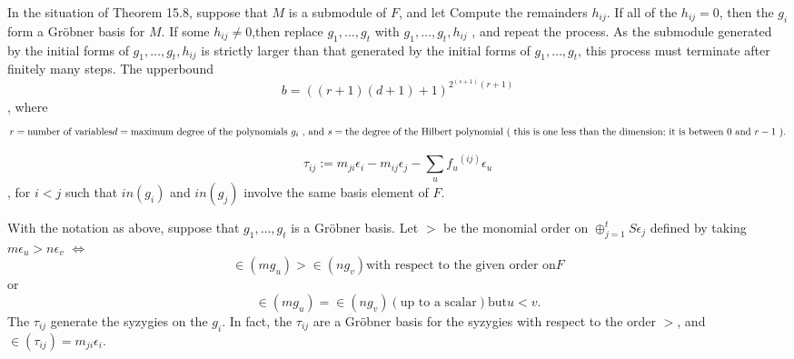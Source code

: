 \documentclass{article}
\begin{document}
{\color{red}

\begin{algo}
In the situation of Theorem 15.8, suppose that \( M \) is a submodule of \( F \), and let
Compute the remainders \( h_{ij} \).
If all of the \( h_{ij}=0 \), then the \( g_i \) form a Gr\"obner basis for \( M \).
If some \( h_{ij} \neq 0\),then replace
\( g_1, \dots,g_t \)
with
\( g_1, \dots,g_t,h_{ij} \)
, and repeat the process.
As the submodule generated by the initial forms of
\(g_1,\dots,g_t,h_{ij} \)
is strictly larger than that generated by the initial forms of
\( g_1, \dots,g_t \),
this process must terminate after finitely many steps.
The upperbound \[
b=\left( \left( r+1 \right)\left( d+1 \right)+1 \right)^{2^{(s+1)}(r+1) }
\],
where
\[
r = \text{number of variables} \\
d = \text{maximum degree of the polynomials \( g_i\) , and } \\
s = \text{the degree of the Hilbert polynomial ( this is one less than the dimension; it is between \( 0 \) and \(r-1\) ).}
\]
\end{algo}

\begin{defn}[\nocite{Eis1}{334}]
\[
\tau_{ij}:=m_{ji}\epsilon_{i} - m_{ij} \epsilon_{j} - \sum_{u} {f_{u}}^{\left( ij \right) } \epsilon_{u} 
\],
for \( i < j \) such that \( in \left( g_{i}  \right) \) and \( in \left( g_{j}  \right) \)
involve the same basis element of \( F \).
\end{defn}
}
{\color{red}
\begin{thm}[Schreyer \cite{Eis1}[15.10]
With the notation as above, suppose that
\( g_1,\dots,g_t\)
is a Gr\"obner basis.
Let \( > \) be the monomial order on
\( \oplus_{j=1}^t S \epsilon_{j} \)
defined by taking
\( m \epsilon_{u} > n \epsilon_{v} \)
\(\iff\)
\[
\in\left(  m g_{u} \right) > \in\left( n g_{v} \right) 
\text{with respect to the given order on} F 
\]
or
\[
\in\left( m g_{u} \right) = \in\left( n g_{v} \right) 
\left( \text{up to a scalar} \right) \text{but} u < v.
\]
The
\( \tau_{ij} \)
generate the syzygies on the
\( g_{i} \).
In fact, the
\( \tau_{ij} \)
are a Gr\"obner basis for the syzygies with respect to the order \( > \),
and
\( \in\left( \tau_{ij} \right) = m_{ji}\epsilon_{i}.\)
\end{thm}
}
\end{document}
